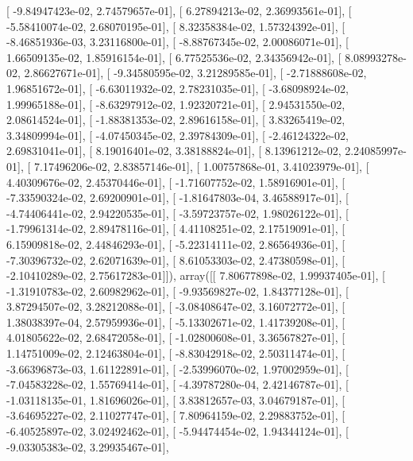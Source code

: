 \documentclass{article}
\begin{document}
       [ -9.84947423e-02,   2.74579657e-01],
       [  6.27894213e-02,   2.36993561e-01],
       [ -5.58410074e-02,   2.68070195e-01],
       [  8.32358384e-02,   1.57324392e-01],
       [ -8.46851936e-03,   3.23116800e-01],
       [ -8.88767345e-02,   2.00086071e-01],
       [  1.66509135e-02,   1.85916154e-01],
       [  6.77525536e-02,   2.34356942e-01],
       [  8.08993278e-02,   2.86627671e-01],
       [ -9.34580595e-02,   3.21289585e-01],
       [ -2.71888608e-02,   1.96851672e-01],
       [ -6.63011932e-02,   2.78231035e-01],
       [ -3.68098924e-02,   1.99965188e-01],
       [ -8.63297912e-02,   1.92320721e-01],
       [  2.94531550e-02,   2.08614524e-01],
       [ -1.88381353e-02,   2.89616158e-01],
       [  3.83265419e-02,   3.34809994e-01],
       [ -4.07450345e-02,   2.39784309e-01],
       [ -2.46124322e-02,   2.69831041e-01],
       [  8.19016401e-02,   3.38188824e-01],
       [  8.13961212e-02,   2.24085997e-01],
       [  7.17496206e-02,   2.83857146e-01],
       [  1.00757868e-01,   3.41023979e-01],
       [  4.40309676e-02,   2.45370446e-01],
       [ -1.71607752e-02,   1.58916901e-01],
       [ -7.33590324e-02,   2.69200901e-01],
       [ -1.81647803e-04,   3.46588917e-01],
       [ -4.74406441e-02,   2.94220535e-01],
       [ -3.59723757e-02,   1.98026122e-01],
       [ -1.79961314e-02,   2.89478116e-01],
       [  4.41108251e-02,   2.17519091e-01],
       [  6.15909818e-02,   2.44846293e-01],
       [ -5.22314111e-02,   2.86564936e-01],
       [ -7.30396732e-02,   2.62071639e-01],
       [  8.61053303e-02,   2.47380598e-01],
       [ -2.10410289e-02,   2.75617283e-01]]), array([[  7.80677898e-02,   1.99937405e-01],
       [ -1.31910783e-02,   2.60982962e-01],
       [ -9.93569827e-02,   1.84377128e-01],
       [  3.87294507e-02,   3.28212088e-01],
       [ -3.08408647e-02,   3.16072772e-01],
       [  1.38038397e-04,   2.57959936e-01],
       [ -5.13302671e-02,   1.41739208e-01],
       [  4.01805622e-02,   2.68472058e-01],
       [ -1.02800608e-01,   3.36567827e-01],
       [  1.14751009e-02,   2.12463804e-01],
       [ -8.83042918e-02,   2.50311474e-01],
       [ -3.66396873e-03,   1.61122891e-01],
       [ -2.53996070e-02,   1.97002959e-01],
       [ -7.04583228e-02,   1.55769414e-01],
       [ -4.39787280e-04,   2.42146787e-01],
       [ -1.03118135e-01,   1.81696026e-01],
       [  3.83812657e-03,   3.04679187e-01],
       [ -3.64695227e-02,   2.11027747e-01],
       [  7.80964159e-02,   2.29883752e-01],
       [ -6.40525897e-02,   3.02492462e-01],
       [ -5.94474454e-02,   1.94344124e-01],
       [ -9.03305383e-02,   3.29935467e-01],
\end{document}
